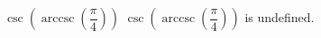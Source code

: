  {$\csc\left(\operatorname{arccsc}\left( \dfrac{\pi}{4} \right)\right)$ }
{ $\csc\left(\operatorname{arccsc}\left( \dfrac{\pi}{4} \right)\right)$ is undefined.}
